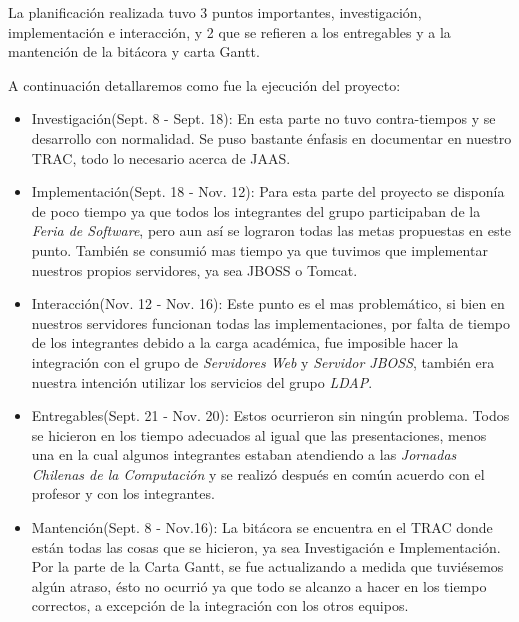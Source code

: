 La planificación realizada tuvo 3 puntos importantes,
investigación, implementación e interacción,
y 2 que se refieren a los entregables y a la mantención
de la bitácora y carta Gantt.

A continuación detallaremos como fue la ejecución del proyecto:

\begin{itemize}

	\item Investigación(Sept. 8 - Sept. 18): En esta parte no tuvo contra-tiempos
		y se desarrollo con normalidad. Se puso bastante énfasis en documentar
		en nuestro TRAC, todo lo necesario acerca de JAAS.

	\item Implementación(Sept. 18 - Nov. 12): Para esta parte del proyecto se disponía
		de poco tiempo ya que todos los integrantes del grupo participaban de la
		\emph{Feria de Software}, pero aun así se lograron todas las metas propuestas
		en este punto. También se consumió mas tiempo ya que tuvimos que implementar
		nuestros propios servidores, ya sea JBOSS o Tomcat.

	\item Interacción(Nov. 12 - Nov. 16): Este punto es el mas problemático, si bien en
		nuestros servidores funcionan todas las implementaciones, por falta de tiempo
		de los integrantes debido a la carga académica, fue imposible hacer la integración
		con el grupo de \emph{Servidores Web} y \emph{Servidor JBOSS},  también era nuestra
		intención utilizar los servicios del grupo \emph{LDAP}.

	\item Entregables(Sept. 21 - Nov. 20): Estos ocurrieron sin ningún problema. Todos se
		hicieron en los tiempo adecuados al igual que las presentaciones, menos una en la
		cual algunos integrantes estaban atendiendo a las \emph{Jornadas Chilenas de la
		Computación} y se realizó después en común acuerdo con el profesor y con los integrantes.

	\item Mantención(Sept. 8 - Nov.16): La bitácora se encuentra en el TRAC donde están todas las
		cosas que se hicieron, ya sea Investigación e Implementación. Por la parte de la Carta
		Gantt, se fue actualizando a medida que tuviésemos algún atraso, ésto no ocurrió ya que
		todo se alcanzo a hacer en los tiempo correctos, a excepción de la integración con los otros equipos. 
\end{itemize}

